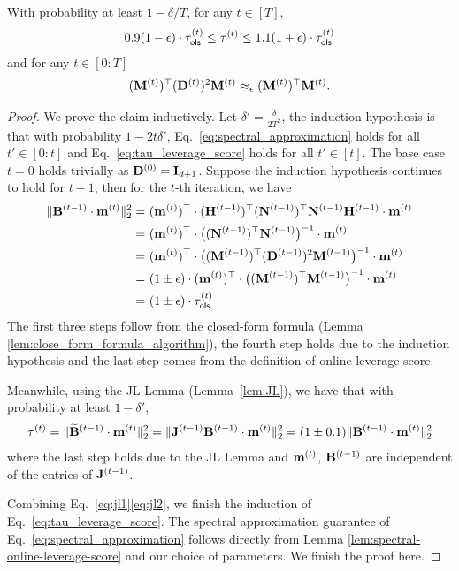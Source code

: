 \begin{lemma}
\label{lem:sampling_probability}
With probability at least $1 - \delta/T$, for any $t \in [T]$,
\begin{align}\label{eq:tau_leverage_score}
    0.9 (1-\epsilon) \cdot \tau_{\mathsf{ols}}^{(t)} \leq \tau^{(t)} \leq 1.1 (1+\epsilon) \cdot \tau_{\mathsf{ols}}^{(t)}
\end{align}
and for any $t \in [0: T]$ 
\begin{align}\label{eq:spectral_approximation}
    (\mathbf{M}^{(t)})^{\top} (\mathbf{D}^{(t)})^2 \mathbf{M}^{(t)} \approx_{\epsilon} (\mathbf{M}^{(t)})^{\top} \mathbf{M}^{(t)}.
\end{align}
\end{lemma}
\begin{proof}
We prove the claim inductively. Let $\delta' = \frac{\delta}{2T^2}$, the induction hypothesis is that with probability $1 - 2 t \delta'$, Eq.~\eqref{eq:spectral_approximation} holds for all $t' \in [0:t]$ and Eq.~\eqref{eq:tau_leverage_score} holds for all $t' \in [t]$. 
The base case $t=0$ holds trivially as $\mathbf{D}^{(0)} = \mathbf{I}_{d+1}$. Suppose the induction hypothesis continues to hold for $t-1$, then for the $t$-th iteration, we have
\begin{align}
    \|\mathbf{B}^{(t-1)} \cdot \mathbf{m}^{(t)}\|_2^2 = &~ (\mathbf{m}^{(t)})^{\top} \cdot (\mathbf{H}^{(t-1)})^{\top} (\mathbf{N}^{(t-1)})^{\top} \mathbf{N}^{(t-1)} \mathbf{H}^{(t-1)} \cdot \mathbf{m}^{(t)} \notag \\
    = &~ (\mathbf{m}^{(t)})^{\top} \cdot \big((\mathbf{N}^{(t-1)})^{\top} \mathbf{N}^{(t-1)} \big)^{-1} \cdot \mathbf{m}^{(t)} \notag \\
    = &~ (\mathbf{m}^{(t)})^{\top} \cdot \big( (\mathbf{M}^{(t-1)})^{\top} (\mathbf{D}^{(t-1)})^2 \mathbf{M}^{(t-1)} \big)^{-1} \cdot \mathbf{m}^{(t)} \notag \\
    = &~ (1 \pm \epsilon) \cdot (\mathbf{m}^{(t)})^{\top} \cdot \big( (\mathbf{M}^{(t-1)})^{\top} \mathbf{M}^{(t-1)} \big)^{-1} \cdot \mathbf{m}^{(t)} \notag \\
    = &~ (1 \pm \epsilon) \cdot \tau_{\mathsf{ols}}^{(t)} \label{eq:jl1}
\end{align}
The first three steps follow from the closed-form formula (Lemma \ref{lem:close_form_formula_algorithm}), the fourth step holds due to the induction hypothesis and the last step comes from the definition of online leverage score.

Meanwhile, using the JL Lemma (Lemma~\ref{lem:JL}), we have that with probability at least $1 - \delta'$, 
\begin{align}
    \tau^{(t)} = \|\widetilde{\mathbf{B}}^{(t-1)} \cdot \mathbf{m}^{(t)}\|_2^2  = \|\mathbf{J}^{(t-1)} \mathbf{B}^{(t-1)} \cdot \mathbf{m}^{(t)}\|_2^2 = (1\pm 0.1) \|\mathbf{B}^{(t-1)} \cdot \mathbf{m}^{(t)}\|_2^2\label{eq:jl2}
\end{align}
where the last step holds due to the JL Lemma and $\mathbf{m}^{(t)}$, $\mathbf{B}^{(t-1)}$ are independent of the entries of $\mathbf{J}^{(t-1)}$.

Combining Eq.~\eqref{eq:jl1}\eqref{eq:jl2}, we finish the induction of Eq.~\eqref{eq:tau_leverage_score}. The spectral approximation guarantee of Eq.~\eqref{eq:spectral_approximation} follows directly from Lemma \ref{lem:spectral-online-leverage-score} and our choice of parameters. We finish the proof here.\qedhere
\end{proof}
